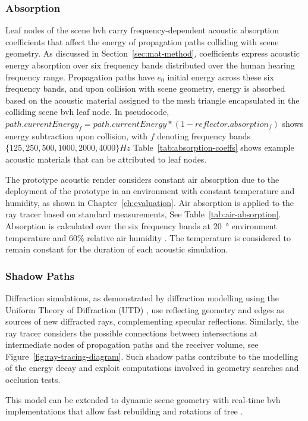 \subsubsection{Absorption}
Leaf nodes of the scene \acrshort{bvh} carry frequency-dependent acoustic absorption coefficients that affect the energy of propagation paths colliding with scene geometry. As discussed in Section~\ref{sec:mat-method}, coefficients express acoustic energy absorption over six frequency bands distributed over the human hearing frequency range. Propagation paths have $e_0$ initial energy across these six frequency bands, and upon collision with scene geometry, energy is absorbed based on the acoustic material assigned to the mesh triangle encapsulated in the colliding scene \acrshort{bvh} leaf node. In pseudocode, $path.currentEnergy_f = path.currentEnergy * (1 - reflector.absorption_f)$ shows energy subtraction upon collision, with $f$ denoting frequency bands $\{ 125, 250, 500, 1000, 2000, 4000 \} Hz$ Table~\ref{tab:absorption-coeffs} shows example acoustic materials that can be attributed to leaf nodes.\par
The prototype acoustic render considers constant air absorption due to the deployment of the prototype in an environment with constant temperature and humidity, as shown in Chapter~\ref{ch:evaluation}. Air absorption is applied to the ray tracer based on standard measurements, See Table~\ref{tab:air-absorption}. Absorption is calculated over the six frequency bands at \qty{20}{\degree} environment temperature and 60\% relative air humidity \citep{nikolic2002improvements,harris1966absorption}. The temperature is considered to remain constant for the duration of each acoustic simulation.


\subsubsection{Shadow Paths}
Diffraction simulations, as demonstrated by diffraction modelling using the Uniform Theory of Diffraction (UTD) \cite{tsingos2001modeling}, use reflecting geometry and edges as sources of new diffracted rays, complementing specular reflections. Similarly, the ray tracer considers the possible connections between intersections at intermediate nodes of propagation paths and the receiver volume, see Figure~\ref{fig:ray-tracing-diagram}. Such shadow paths contribute to the modelling of the energy decay and exploit computations involved in geometry searches and occlusion tests.\par
This model can be extended to dynamic scene geometry with real-time \acrshort{bvh} implementations that allow fast rebuilding and rotations of tree \citep{kopta2012fast}.

